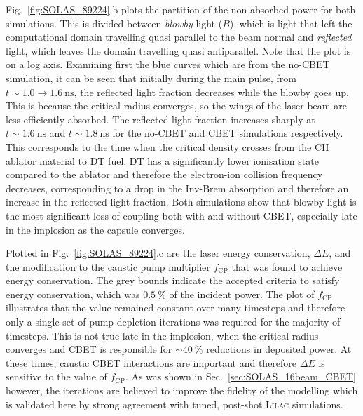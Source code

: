 Fig.~\ref{fig:SOLAS_89224}.b plots the partition of the non-absorbed power for both simulations.
This is divided between \textit{blowby} light ($B$), which is light that left the computational domain travelling quasi parallel to the beam normal and \textit{reflected} light, which leaves the domain travelling quasi antiparallel.
Note that the plot is on a log axis.
Examining first the blue curves which are from the no-\ac{CBET} simulation, it can be seen that initially during the main pulse, from $t\sim 1.0\rightarrow1.6\ \text{ns}$, the reflected light fraction decreases while the blowby goes up.
This is because the critical radius converges, so the wings of the laser beam are less efficiently absorbed.
The reflected light fraction increases sharply at $t \sim 1.6\ \text{ns}$ and $t \sim 1.8\ \text{ns}$ for the no-\ac{CBET} and \ac{CBET} simulations respectively.
This corresponds to the time when the critical density crosses from the CH ablator material to DT fuel.
DT has a significantly lower ionisation state compared to the ablator and therefore the electron-ion collision frequency decreases, corresponding to a drop in the \ac{Inv-Brem} absorption and therefore an increase in the reflected light fraction.
Both simulations show that blowby light is the most significant loss of coupling both with and without \ac{CBET}, especially late in the implosion as the capsule converges.

Plotted in Fig.~\ref{fig:SOLAS_89224}.c are the laser energy conservation, $\Delta E$, and the modification to the caustic pump multiplier $f_{\text{CP}}$ that was found to achieve energy conservation.
The grey bounds indicate the accepted criteria to satisfy energy conservation, which was $0.5\ \%$ of the incident power.
The plot of $f_{\text{CP}}$ illustrates that the value remained constant over many timesteps and therefore only a single set of pump depletion iterations was required for the majority of timesteps.
This is not true late in the implosion, when the critical radius converges and \ac{CBET} is responsible for $\sim40\ \%$ reductions in deposited power.
At these times, caustic \ac{CBET} interactions are important and therefore $\Delta E$ is sensitive to the value of $f_{\text{CP}}$.
As was shown in Sec.~\ref{sec:SOLAS_16beam_CBET} however, the iterations are believed to improve the fidelity of the modelling which is validated here by strong agreement with tuned, post-shot \textsc{Lilac} simulations.

